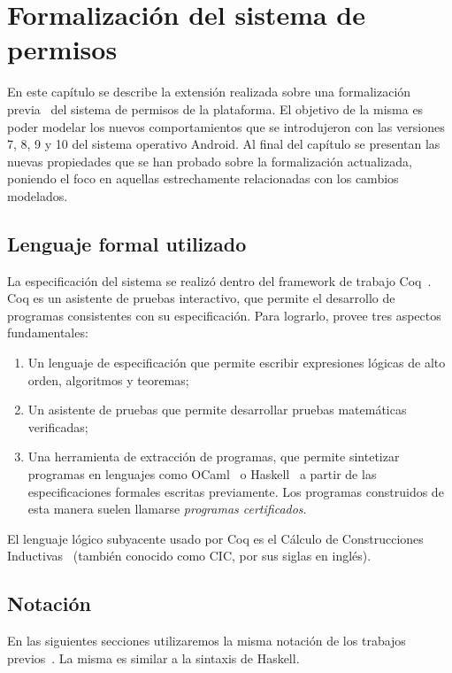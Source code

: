 \chapter{Formalización del sistema de permisos}
\label{chapter:formalization}

En este capítulo se describe la extensión realizada sobre una formalización previa~\cite{luna-cleiej}
del sistema de permisos de la plataforma. El objetivo de la misma es poder modelar los nuevos
comportamientos que se introdujeron con las versiones 7, 8, 9 y 10 del sistema operativo Android. Al
final del capítulo se presentan las nuevas propiedades que se han probado sobre la formalización
actualizada, poniendo el foco en aquellas estrechamente relacionadas con los cambios modelados.

\section{Lenguaje formal utilizado}
\label{section:formalization:formal-language}
La especificación del sistema se realizó dentro del framework de trabajo Coq~\cite{coq}. Coq es un
asistente de pruebas interactivo, que permite el desarrollo de programas consistentes con su
especificación. Para lograrlo, provee tres aspectos fundamentales:
\begin{enumerate}
    \item Un lenguaje de especificación que permite escribir expresiones lógicas de alto orden,
          algoritmos y teoremas;
    \item Un asistente de pruebas que permite desarrollar pruebas matemáticas verificadas;
    \item Una herramienta de extracción de programas, que permite sintetizar programas en lenguajes
          como OCaml~\cite{ocaml} o Haskell~\cite{haskell} a partir de las especificaciones formales
          escritas previamente. Los programas construidos de esta manera suelen llamarse
          \textit{programas certificados}.
\end{enumerate}

El lenguaje lógico subyacente usado por Coq es el Cálculo de Construcciones Inductivas~\cite{cic}
(también conocido como CIC, por sus siglas en inglés).

\section{Notación}
En las siguientes secciones  utilizaremos la misma notación de los trabajos
previos~\cite{luna-cleiej,betarte-2017,betarte-2016}. La misma es similar a la sintaxis de Haskell.

